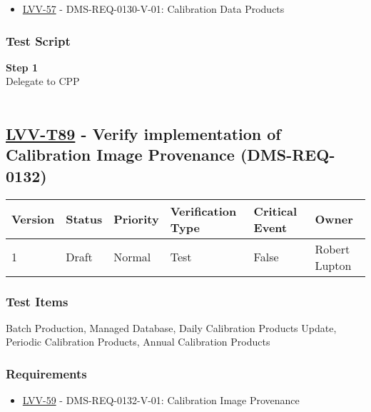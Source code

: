 \begin{itemize}
\tightlist
\item
  \href{https://jira.lsstcorp.org/browse/LVV-57}{LVV-57} -
  DMS-REQ-0130-V-01: Calibration Data Products
\end{itemize}

\hypertarget{test-script-65}{%
\subsubsection{Test Script}\label{test-script-65}}

\textbf{Step 1}\\
Delegate to CPP\\
~\\

\hypertarget{lvv-t89---verify-implementation-of-calibration-image-provenance-dms-req-0132}{%
\subsection{\texorpdfstring{\href{https://jira.lsstcorp.org/secure/Tests.jspa\#/testCase/LVV-T89}{LVV-T89}
- Verify implementation of Calibration Image Provenance
(DMS-REQ-0132)}{LVV-T89 - Verify implementation of Calibration Image Provenance (DMS-REQ-0132)}}\label{lvv-t89---verify-implementation-of-calibration-image-provenance-dms-req-0132}}

\begin{longtable}[]{@{}llllll@{}}
\toprule
Version & Status & Priority & Verification Type & Critical Event &
Owner\tabularnewline
\midrule
\endhead
1 & Draft & Normal & Test & False & Robert Lupton\tabularnewline
\bottomrule
\end{longtable}

\hypertarget{test-items-65}{%
\subsubsection{Test Items}\label{test-items-65}}

Batch Production, Managed Database, Daily Calibration Products Update,
Periodic Calibration Products, Annual Calibration Products

\hypertarget{requirements-66}{%
\subsubsection{Requirements}\label{requirements-66}}

\begin{itemize}
\tightlist
\item
  \href{https://jira.lsstcorp.org/browse/LVV-59}{LVV-59} -
  DMS-REQ-0132-V-01: Calibration Image Provenance
\end{itemize}


